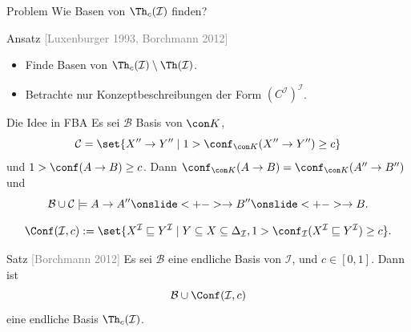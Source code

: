 \documentclass[ngerman]{beamer}
\newcommand{\pseudocite}[1]{\textcolor{gray}{[#1]}}
\begin{document}
\begin{frame}

  \onslide<+->

  \begin{block}{Problem}
    Wie Basen von $\Th_{c}(\mathcal{I})$ finden?
  \end{block}

  \onslide<+->

  \begin{block}{Ansatz \pseudocite{Luxenburger 1993, Borchmann 2012}}
    \begin{itemize}
    \item<+-> Finde Basen von $\Th_{c}(\mathcal{I}) \setminus \Th(\mathcal{I})$.
    \item<+-> Betrachte nur Konzeptbeschreibungen der Form $(C^{\mathcal{I}})^{\mathcal{I}}$.
    \end{itemize}
  \end{block}

  \onslide<+->
  
  \begin{block}{Die Idee in FBA}
    \onslide<+->%
    Es sei $\mathcal{B}$ Basis von $\con K$,
    \begin{equation*}
      \mathcal{C} = \set{ X'' \to Y'' \mid 1 > \conf_{\con K}(X'' \to Y'') \ge c }
    \end{equation*}
    und $1 > \conf(A \to B) \ge c$.  \onslide<+-> Dann $\conf_{\con K}(A \to B) =
    \conf_{\con K}(A'' \to B'')$ \onslide<+-> und
    \begin{equation*}
      \mathcal{B} \cup \mathcal{C} \models A \to A'' \onslide<+-> \to B'' \onslide<+->
      \to B.
    \end{equation*}
  \end{block}

\end{frame}

\begin{frame}

  \onslide<+->

  \begin{Definition}
    \begin{equation*}
      \Conf(\mathcal{I}, c) := \set{ X^{\mathcal{I}} \sqsubseteq Y^{\mathcal{I}} \mid Y
        \subseteq X \subseteq \Delta_{\mathcal{I}}, 1 > \conf_{\mathcal{I}}(
        X^{\mathcal{I}} \sqsubseteq Y^{\mathcal{I}}) \ge c}.
    \end{equation*}
  \end{Definition}

  \onslide<+->

  \begin{block}{Satz \pseudocite{Borchmann 2012}}
    Es sei $\mathcal{B}$ eine endliche Basis von $\mathcal{I}$, und $c \in [0, 1]$.  Dann
    ist 
    \begin{equation*}
      \mathcal{B} \cup \Conf(\mathcal{I},c)
    \end{equation*}
    eine endliche Basis $\Th_c(\mathcal{I})$.
  \end{block}
  
\end{frame}
\end{document}
